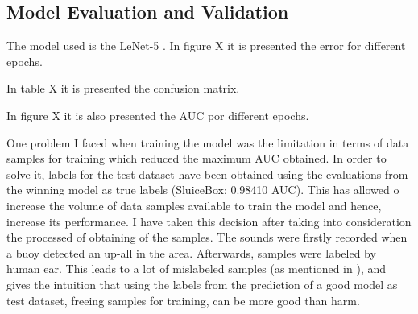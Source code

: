 \documentclass[]{article}
\begin{document}

\subsection{Model Evaluation and Validation}\label{model-evaluation-and-validation}

The model used is the LeNet-5 \cite{Lecun98}. In figure X it is presented the error for different epochs.

In table X it is presented the confusion matrix.

In figure X it is also presented the AUC por different epochs.

One problem I faced when training the model was the limitation in terms of data samples for training which reduced the maximum AUC obtained. In order to solve it, labels for the test dataset have been obtained using the evaluations from the winning model as true labels (SluiceBox: 0.98410 AUC). This has allowed o increase the volume of data samples available to train the model and hence, increase its performance. I have taken this decision after taking into consideration the processed of obtaining of the samples. The sounds were firstly recorded when a buoy detected an up-all in the area. Afterwards, samples were labeled by human ear. This leads to a lot of mislabeled samples (as mentioned in \cite{Nouriblog}), and gives the intuition that using the labels from the prediction of a good model as test dataset, freeing samples for training, can be more good than harm.
\end{document}
